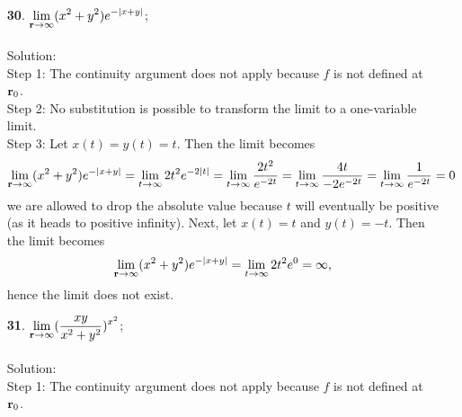\documentclass[12pt]{amsbook}
\begin{document}
\begin{enumerate}
{\sf Step 1}: The continuity argument does not apply because $f$ is not defined at ${\bf r}_0$.
\\
{\sf Step 2}: No substitution is possible to transform the limit to a one-variable
limit.
\\
{\sf Step 3}: Let $x(t)=y(t)=t$. Then the limit becomes
$$\lim_{{\bf r} \rightarrow \infty}\sin(\frac{\pi x}{2x+y})=\lim_{t \rightarrow \infty}\sin(\frac{\pi t}{2t+t})=\lim_{t \rightarrow \infty}\sin(\frac{\pi }{3})=\frac{\sqrt{3}}{2}$$
\\
Now let $x(t)=t, y(t)=2t$. Then the limit becomes
$$\lim_{{\bf r} \rightarrow \infty}\sin(\frac{\pi x}{2x+y})=\lim_{t \rightarrow \infty}\sin(\frac{\pi t}{2t+2t})=\lim_{t \rightarrow \infty}\sin(\frac{\pi }{4})=\frac{\sqrt{2}}{2}$$
so the limit does not exist.
\\
\item[{\small\bf 30}.] $\! \begin{aligned}[t]
\lim_{{\bf r} \rightarrow \infty} (x^2+y^2)e^{-|x+y|}
\end{aligned}$;
\\
\\
{\sc Solution}:
\\
{\sf Step 1}: The continuity argument does not apply because $f$ is not defined at ${\bf r}_0$.
\\
{\sf Step 2}: No substitution is possible to transform the limit to a one-variable
limit.
\\
{\sf Step 3}: Let $x(t)=y(t)=t$. Then the limit becomes
$$\lim_{{\bf r} \rightarrow \infty} (x^2+y^2)e^{-|x+y|}=\lim_{t \rightarrow \infty} 2t^2e^{-2|t|}=\lim_{t \rightarrow \infty} \frac{2t^2}{e^{-2t}}=\lim_{t \rightarrow \infty} \frac{4t}{-2e^{-2t}}=\lim_{t \rightarrow \infty} \frac{1}{e^{-2t}}=0$$
we are allowed to drop the absolute value because $t$ will eventually be positive (as it heads to positive infinity). Next, let $x(t)=t$ and $y(t)=-t$. Then the limit becomes
$$\lim_{{\bf r} \rightarrow \infty} (x^2+y^2)e^{-|x+y|}=\lim_{t \rightarrow \infty} 2t^2e^{0}=\infty,$$
hence the limit does not exist.
\\
\item[{\small\bf 31}.] $\! \begin{aligned}[t]
\lim_{{\bf r} \rightarrow \infty} (\frac{xy}{x^2+y^2})^{x^2}
\end{aligned}$;
\\
\\
{\sc Solution}:
\\
{\sf Step 1}: The continuity argument does not apply because $f$ is not defined at ${\bf r}_0$.

\end{enumerate}
\end{document}
